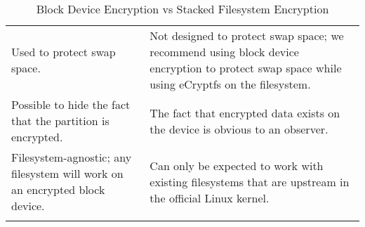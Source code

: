 \begin{table}[tp]
\begin{tabularx}{\textwidth}{|| m{} || m{} ||}
		\hhline{|:=::=:|}
		Used to protect swap space. & Not designed to protect swap space; we recommend using block device encryption to protect swap space while using eCryptfs on the filesystem. \\
		\hhline{|:=::=:|}
		Possible to hide the fact that the partition is encrypted. & The fact that encrypted data exists on the device is obvious to an observer. \\
		\hhline{|:=::=:|}
		Filesystem-agnostic; any filesystem will work on an encrypted block device. & Can only be expected to work with existing filesystems that are upstream in the official Linux kernel. \\
		\hhline{|b:=:b:=:b|}
	\end{tabularx}
	\caption{Block Device Encryption vs Stacked Filesystem Encryption}
\end{table}
